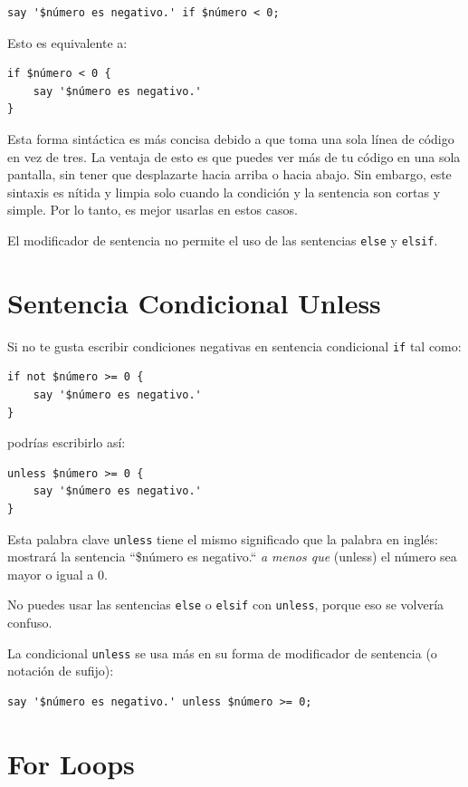 \begin{verbatim}
say '$número es negativo.' if $número < 0;
\end{verbatim}
%
Esto es equivalente a:
\begin{verbatim}
if $número < 0 {
    say '$número es negativo.' 
}
\end{verbatim}
%
Esta forma sintáctica es más concisa debido a que toma
una sola línea de código en vez de tres. La ventaja de esto
es que puedes ver más de tu código en una sola pantalla,
sin tener que desplazarte hacia arriba o hacia abajo. 
Sin embargo, este sintaxis es nítida y limpia solo cuando
la condición y la sentencia son cortas y simple. Por lo
tanto, es mejor usarlas en estos casos.

El modificador de sentencia no permite el uso de las
sentencias {\tt else} y {\tt elsif}.

\section{Sentencia Condicional Unless}

Si no te gusta escribir condiciones negativas en sentencia
condicional {\tt if} tal como:
%
\begin{verbatim}
if not $número >= 0 {
    say '$número es negativo.' 
}
\end{verbatim}
%

podrías escribirlo así:

\begin{verbatim}
unless $número >= 0 {
    say '$número es negativo.' 
}
\end{verbatim}
%
Esta palabra clave \verb|unless| tiene el mismo significado
que la palabra en inglés: mostrará la sentencia ``\$número es negativo.``
\emph{a menos que} (unless) el número sea mayor o igual a 0.

No puedes usar las sentencias {\tt else} o {\tt elsif} con 
{\tt unless}, porque eso se volvería confuso.

La condicional {\tt unless} se usa más en su forma 
de modificador de sentencia (o notación de sufijo):
 
 

\begin{verbatim}
say '$número es negativo.' unless $número >= 0;
\end{verbatim}
%

\section{For Loops}
\label{for_loops}

